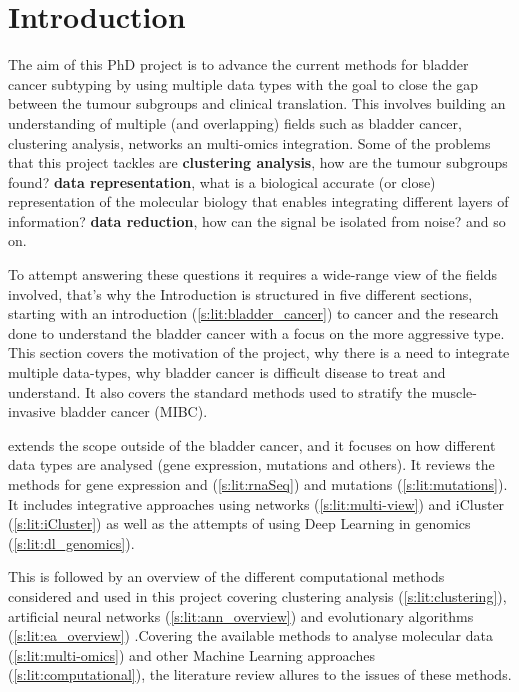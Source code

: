 

\section{Introduction}


The aim of this PhD project is to advance the current methods for bladder cancer subtyping by using multiple data types with the goal to close the gap between the tumour subgroups and clinical translation. This involves building an understanding of multiple (and overlapping) fields such as bladder cancer, clustering analysis, networks an multi-omics integration. Some of the problems that this project tackles are \textbf{clustering analysis}, how are the tumour subgroups found? \textbf{data representation}, what is a biological accurate (or close) representation of the molecular biology that enables integrating different layers of information? \textbf{data reduction}, how can the signal be isolated from noise? and so on.

To attempt answering these questions it requires a wide-range view of the fields involved, that's why the Introduction is structured in five different sections, starting with an introduction (\cref{s:lit:bladder_cancer}) to cancer and the research done to understand the bladder cancer with a focus on the more aggressive type. This section covers the motivation of the project, why there is a need to integrate multiple data-types, why bladder cancer is difficult disease to treat and understand. It also covers the standard methods used to stratify the muscle-invasive bladder cancer (MIBC).

 extends the scope outside of the bladder cancer, and it focuses on how different data types are analysed (gene expression, mutations and others). It reviews the methods for gene expression and  (\ref{s:lit:rnaSeq}) and mutations (\ref{s:lit:mutations}). It includes integrative approaches using networks (\ref{s:lit:multi-view}) and iCluster (\ref{s:lit:iCluster}) as well as the attempts of using Deep Learning in genomics (\ref{s:lit:dl_genomics}). 

This is followed by an overview of the different computational methods considered and used in this project covering clustering analysis (\ref{s:lit:clustering}), artificial neural networks (\ref{s:lit:ann_overview}) and evolutionary algorithms (\ref{s:lit:ea_overview}) .Covering the available methods to analyse molecular data (\ref{s:lit:multi-omics}) and other Machine Learning approaches (\ref{s:lit:computational}), the literature review allures to the issues of these methods.

